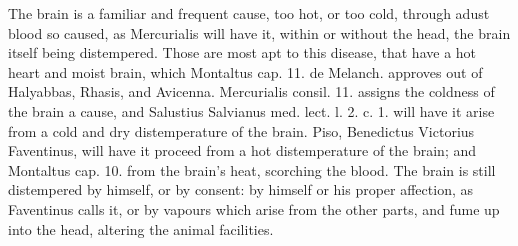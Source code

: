 {The brain is a familiar and frequent cause, too hot, or too cold,
 through adust blood so caused, as Mercurialis will have it,
within or without the head, the brain itself being distempered. Those
are most apt to this disease, that have a hot heart and moist
brain, which Montaltus cap. 11. de Melanch. approves out of Halyabbas,
Rhasis, and Avicenna. \textlatin{Mercurialis consil. 11.} assigns the coldness of
the brain a cause, and Salustius Salvianus \textlatin{med. lect. l. 2. c. 1.}
will have it arise from a cold and dry distemperature of the
brain. Piso, Benedictus Victorius Faventinus, will have it proceed from
a hot distemperature of the brain; and Montaltus cap. 10.
from the brain's heat, scorching the blood. The brain is still
distempered by himself, or by consent: by himself or his proper
affection, as Faventinus calls it, or by vapours which arise from
the other parts, and fume up into the head, altering the animal
facilities.

}
